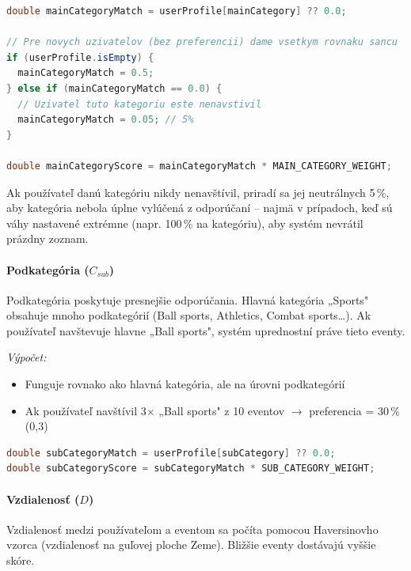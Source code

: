 \begin{lstlisting}[language=Java, caption=Výpočet skóre hlavnej kategórie]
double mainCategoryMatch = userProfile[mainCategory] ?? 0.0;

// Pre novych uzivatelov (bez preferencii) dame vsetkym rovnaku sancu
if (userProfile.isEmpty) {
  mainCategoryMatch = 0.5;
} else if (mainCategoryMatch == 0.0) {
  // Uzivatel tuto kategoriu este nenavstivil
  mainCategoryMatch = 0.05; // 5%
}

double mainCategoryScore = mainCategoryMatch * MAIN_CATEGORY_WEIGHT;
\end{lstlisting}

Ak používateľ danú kategóriu nikdy nenavštívil, priradí sa jej neutrálnych 5\,\%, aby kategória nebola úplne vylúčená z odporúčaní -- najmä v prípadoch, keď sú váhy nastavené extrémne (napr. 100\,\% na kategóriu), aby systém nevrátil prázdny zoznam.

\paragraph{Podkategória ($C_{sub}$)}

Podkategória poskytuje presnejšie odporúčania. Hlavná kategória „Sports" obsahuje mnoho podkategórií (Ball sports, Athletics, Combat sports\ldots). Ak používateľ navštevuje hlavne „Ball sports", systém uprednostní práve tieto eventy.

\textit{Výpočet:}
\begin{itemize}
    \item Funguje rovnako ako hlavná kategória, ale na úrovni podkategórií
    \item Ak používateľ navštívil 3$\times$ „Ball sports" z 10 eventov $\rightarrow$ preferencia = 30\,\% (0,3)
\end{itemize}

\begin{lstlisting}[language=Java, caption=Výpočet skóre podkategórie]
double subCategoryMatch = userProfile[subCategory] ?? 0.0;
double subCategoryScore = subCategoryMatch * SUB_CATEGORY_WEIGHT;
\end{lstlisting}

\paragraph{Vzdialenosť ($D$)}

Vzdialenosť medzi používateľom a eventom sa počíta pomocou Haversinovho vzorca (vzdialenosť na guľovej ploche Zeme). Bližšie eventy dostávajú vyššie skóre.

